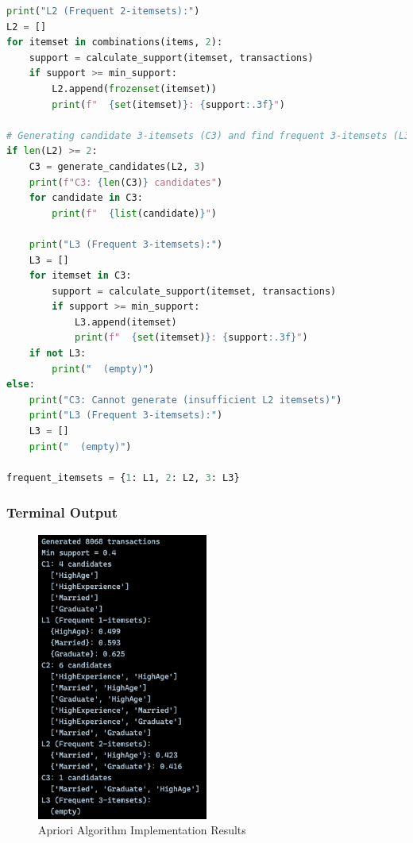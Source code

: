 \documentclass[12pt,a4paper]{article}
\begin{document}
\begin{lstlisting}[language=Python, caption=Run Apriori on Market Basket Dataset]
print("L2 (Frequent 2-itemsets):")
L2 = []
for itemset in combinations(items, 2):
    support = calculate_support(itemset, transactions)
    if support >= min_support:
        L2.append(frozenset(itemset))
        print(f"  {set(itemset)}: {support:.3f}")

# Generating candidate 3-itemsets (C3) and find frequent 3-itemsets (L3)
if len(L2) >= 2:
    C3 = generate_candidates(L2, 3)
    print(f"C3: {len(C3)} candidates")
    for candidate in C3:
        print(f"  {list(candidate)}")
        
    print("L3 (Frequent 3-itemsets):")
    L3 = []
    for itemset in C3:
        support = calculate_support(itemset, transactions)
        if support >= min_support:
            L3.append(itemset)
            print(f"  {set(itemset)}: {support:.3f}")
    if not L3:
        print("  (empty)")
else:
    print("C3: Cannot generate (insufficient L2 itemsets)")
    print("L3 (Frequent 3-itemsets):")
    L3 = []
    print("  (empty)")
    
frequent_itemsets = {1: L1, 2: L2, 3: L3}
\end{lstlisting}

\newpage
\subsubsection{Terminal Output}

\begin{figure}[h!]
    \centering
    \includegraphics[width=0.5\textwidth]{Figures/apriori.png}
    \caption{Apriori Algorithm Implementation Results}
    \label{fig:apriori_candidates}
\label{fig:apriori_results}
\end{figure}
\end{document}
